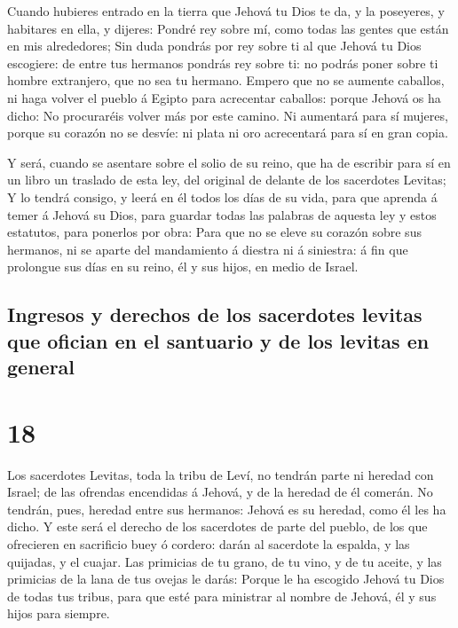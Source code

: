  Cuando hubieres entrado en la tierra que Jehová tu Dios te
da, y la poseyeres, y habitares en ella, y dijeres: Pondré rey sobre mí,
como todas las gentes que están en mis alrededores;  Sin
duda pondrás por rey sobre ti al que Jehová tu Dios escogiere: de entre
tus hermanos pondrás rey sobre ti: no podrás poner sobre ti hombre
extranjero, que no sea tu hermano.  Empero que no se
aumente caballos, ni haga volver el pueblo á Egipto para acrecentar
caballos: porque Jehová os ha dicho: No procuraréis volver más por este
camino.  Ni aumentará para sí mujeres, porque su corazón no
se desvíe: ni plata ni oro acrecentará para sí en gran copia.

 Y será, cuando se asentare sobre el solio de su reino, que
ha de escribir para sí en un libro un traslado de esta ley, del original
de delante de los sacerdotes Levitas;  Y lo tendrá consigo,
y leerá en él todos los días de su vida, para que aprenda á temer á
Jehová su Dios, para guardar todas las palabras de aquesta ley y estos
estatutos, para ponerlos por obra:  Para que no se eleve su
corazón sobre sus hermanos, ni se aparte del mandamiento á diestra ni á
siniestra: á fin que prolongue sus días en su reino, él y sus hijos, en
medio de Israel.

\hypertarget{ingresos-y-derechos-de-los-sacerdotes-levitas-que-ofician-en-el-santuario-y-de-los-levitas-en-general}{%
\subsection{Ingresos y derechos de los sacerdotes levitas que ofician en
el santuario y de los levitas en
general}\label{ingresos-y-derechos-de-los-sacerdotes-levitas-que-ofician-en-el-santuario-y-de-los-levitas-en-general}}

\hypertarget{section-17}{%
\section{18}\label{section-17}}

 Los sacerdotes Levitas, toda la tribu de Leví, no tendrán
parte ni heredad con Israel; de las ofrendas encendidas á Jehová, y de
la heredad de él comerán.  No tendrán, pues, heredad entre
sus hermanos: Jehová es su heredad, como él les ha dicho.  Y
este será el derecho de los sacerdotes de parte del pueblo, de los que
ofrecieren en sacrificio buey ó cordero: darán al sacerdote la espalda,
y las quijadas, y el cuajar.  Las primicias de tu grano, de
tu vino, y de tu aceite, y las primicias de la lana de tus ovejas le
darás:  Porque le ha escogido Jehová tu Dios de todas tus
tribus, para que esté para ministrar al nombre de Jehová, él y sus hijos
para siempre.

